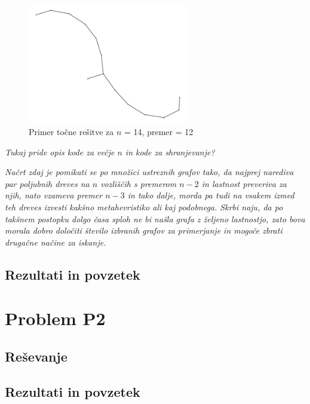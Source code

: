 \documentclass[a4paper, 12 pt]{article}
\begin{document}
\begin{figure}[H]
\centering
  \includegraphics[width=7cm]{drevo14diam12.png}
  \caption{Primer točne rešitve za $n$ = 14, premer = 12}
  \label{fig:graf1}
\end{figure}






\vspace{1cm}

\textit{Tukaj pride opis kode za večje $n$ in kode za shranjevanje?}

\vspace{1cm}

\itshape{ Načrt zdaj je pomikati se po množici ustreznih grafov tako, da najprej narediva par poljubnih dreves na $n$ vozliščih s premerom $n - 2$ in lastnost preveriva za njih, nato vzameva premer $n - 3$ in tako dalje, morda pa tudi na vsakem izmed teh dreves izvesti kakšno metahevristiko ali kaj podobnega. Skrbi naju, da po takšnem postopku dolgo časa sploh ne bi našla grafa z željeno lastnostjo, zato bova morala dobro določiti število izbranih grafov za primerjanje in mogoče zbrati drugačne načine za iskanje.}

\subsection{Rezultati in povzetek}


\pagebreak

\section{Problem P2}






\subsection{Reševanje}

\subsection{Rezultati in povzetek}
\end{document}
